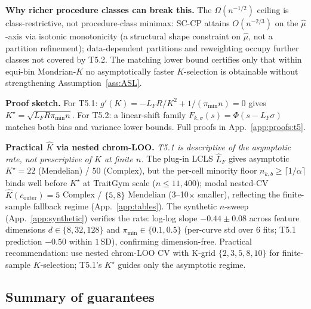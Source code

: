 \noindent\textbf{Why richer procedure classes can break this.} The $\Omega(n^{-1/2})$ ceiling is class-restrictive, not procedure-class minimax: SC-CP \citep{vanderlaan2024sccp} attains $O(n^{-2/3})$ on the $\hat\mu$-axis via isotonic monotonicity (a structural shape constraint on $\hat\mu$, not a partition refinement); data-dependent partitions \citep{plassier2025cp2hpd} and reweighting \citep{tibshirani2019weighted} occupy further classes not covered by T5.2. The matching lower bound certifies only that within equi-bin Mondrian-$K$ no asymptotically faster $K$-selection is obtainable without strengthening Assumption~\ref{ass:ASL}.

\noindent\textbf{Proof sketch.} For T5.1: $g'(K) = -L_F R / K^2 + 1/(\pi_{\min} n) = 0$ gives $K^\star = \sqrt{L_F R \pi_{\min} n}$. For T5.2: a linear-shift family $F_{k,\sigma}(s) = \Phi(s - L_F \sigma)$ matches both bias and variance lower bounds. Full proofs in App.~\ref{app:proofs:t5}.

\noindent\textbf{Practical $\hat K$ via nested chrom-LOO.} \emph{T5.1 is descriptive of the asymptotic rate, not prescriptive of $K$ at finite $n$.} The plug-in LCLS $\hat L_F$ \citep{lcls2024lipschitz} gives asymptotic $K^\star = 22$ (Mendelian) / $50$ (Complex), but the per-cell minority floor $n_{k,b} \geq \lceil 1/\alpha\rceil$ binds well before $K^\star$ at TraitGym scale ($n \leq 11{,}400$); modal nested-CV $\hat K(c_{\mathrm{outer}}) = 5$ Complex / $\{5, 8\}$ Mendelian (3--10$\times$ smaller), reflecting the finite-sample fallback regime (App.~\ref{app:tables}). The synthetic $n$-sweep (App.~\ref{app:synthetic}) verifies the rate: log-log slope $-0.44 \pm 0.08$ across feature dimensions $d \in \{8, 32, 128\}$ and $\pi_{\min} \in \{0.1, 0.5\}$ (per-curve std over 6 fits; T5.1 prediction $-0.50$ within $1$\,SD), confirming dimension-free. Practical recommendation: use nested chrom-LOO CV with K-grid $\{2, 3, 5, 8, 10\}$ for finite-sample $K$-selection; T5.1's $K^\star$ guides only the asymptotic regime.

\subsection{Summary of guarantees}

